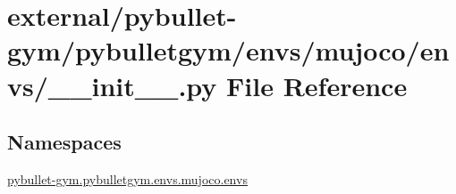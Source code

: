 \hypertarget{external_2pybullet-gym_2pybulletgym_2envs_2mujoco_2envs_2____init_____8py}{}\section{external/pybullet-\/gym/pybulletgym/envs/mujoco/envs/\+\_\+\+\_\+init\+\_\+\+\_\+.py File Reference}
\label{external_2pybullet-gym_2pybulletgym_2envs_2mujoco_2envs_2____init_____8py}
\subsection*{Namespaces}
\begin{DoxyCompactItemize}
\item 
 \hyperlink{namespacepybullet-gym_1_1pybulletgym_1_1envs_1_1mujoco_1_1envs}{pybullet-\/gym.\+pybulletgym.\+envs.\+mujoco.\+envs}
\end{DoxyCompactItemize}
